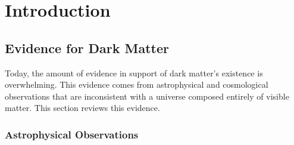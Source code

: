 \graphicspath{{img/introduction/}}


\chapter{Introduction}
\label{chapter:introduction}



\section{Evidence for Dark Matter}
\label{ch1:sec:DM_evidence}

Today, the amount of evidence in support of dark matter's existence is overwhelming. This evidence comes from astrophysical and cosmological observations that are inconsistent with a universe composed entirely of visible matter. This section reviews this evidence. 

\subsection{Astrophysical Observations}

